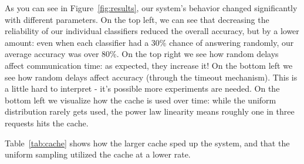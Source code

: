 \documentclass[12pt]{article}
\begin{document}
As you can see in Figure~\ref{fig:results}, our system's behavior changed significantly with different parameters.
On the top left, we can see that decreasing the reliability of our individual classifiers reduced the overall accuracy, but by a lower amount: 
    even when each classifier had a 30\% chance of answering randomly, our average accuracy was over 80\%.
On the top right we see how random delays affect communication time: as expected, they increase it!
On the bottom left we see how random delays affect accuracy (through the timeout mechanism).
This is a little hard to interpret - it's possible more experiments are needed.
On the bottom left we visualize how the cache is used over time: while the uniform distribution rarely gets used, the power law linearity means roughly one in three requests hits the cache.

Table~\ref{tab:cache} shows how the larger cache sped up the system, and that the uniform sampling utilized the cache at a lower rate.
\end{document}

